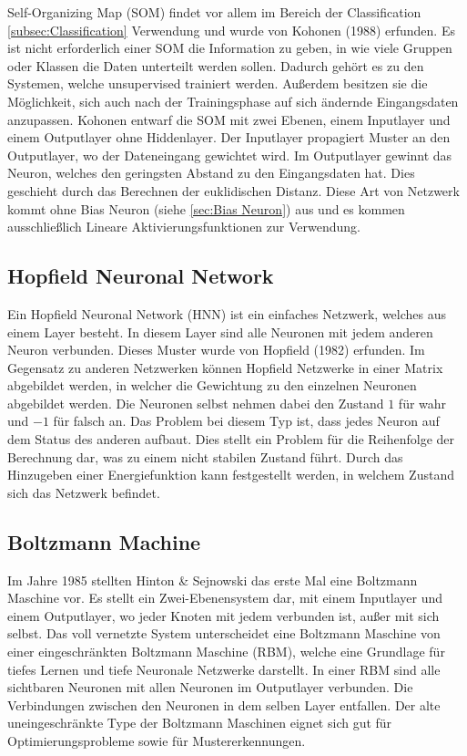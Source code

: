 Self-Organizing Map (SOM) findet vor allem im Bereich der Classification \ref{subsec:Classification} Verwendung und wurde von Kohonen (1988) erfunden. 
Es ist nicht erforderlich einer SOM die Information zu geben, in wie viele Gruppen oder Klassen die Daten unterteilt werden sollen. 
Dadurch gehört es zu den Systemen, welche unsupervised trainiert werden. 
Außerdem besitzen sie die Möglichkeit, sich auch nach der Trainingsphase auf sich ändernde Eingangsdaten anzupassen. 
Kohonen entwarf die SOM mit zwei Ebenen, einem Inputlayer und einem Outputlayer ohne Hiddenlayer. 
Der Inputlayer propagiert Muster an den Outputlayer, wo der Dateneingang gewichtet wird. 
Im Outputlayer gewinnt das Neuron, welches den geringsten Abstand zu den Eingangsdaten hat.
Dies geschieht durch das Berechnen der euklidischen Distanz. 
Diese Art von Netzwerk kommt ohne Bias Neuron (siehe \ref{sec:Bias Neuron}) aus und es kommen ausschließlich Lineare Aktivierungsfunktionen zur Verwendung.


\subsection{Hopfield Neuronal Network}

Ein Hopfield Neuronal Network (HNN) \cite{demuth2014neural} ist ein einfaches Netzwerk, welches aus einem Layer besteht. 
In diesem Layer sind alle Neuronen mit jedem anderen Neuron verbunden. 
Dieses Muster wurde von Hopfield (1982) erfunden. 
Im Gegensatz zu anderen Netzwerken können Hopfield Netzwerke in einer Matrix abgebildet werden, in welcher die Gewichtung zu den einzelnen Neuronen abgebildet werden. 
Die Neuronen selbst nehmen dabei den Zustand $1$ für wahr und $-1$ für falsch an.
Das Problem bei diesem Typ ist, dass jedes Neuron auf dem Status des anderen aufbaut.
Dies stellt ein Problem für die Reihenfolge der Berechnung dar, was zu einem nicht stabilen Zustand führt.
Durch das Hinzugeben einer Energiefunktion kann festgestellt werden, in welchem Zustand sich das Netzwerk befindet.

\subsection{Boltzmann Machine}

Im Jahre 1985 stellten Hinton \& Sejnowski \cite{Hinton:Boltzman:2007} das erste Mal eine Boltzmann Maschine vor.
Es stellt ein Zwei-Ebenensystem dar, mit einem Inputlayer und einem Outputlayer, wo jeder Knoten mit jedem verbunden ist, außer mit sich selbst.
Das voll vernetzte System unterscheidet eine Boltzmann Maschine von einer eingeschränkten Boltzmann Maschine (RBM), welche eine Grundlage für tiefes Lernen und tiefe Neuronale Netzwerke darstellt.
In einer RBM sind alle sichtbaren Neuronen mit allen Neuronen im Outputlayer verbunden. 
Die Verbindungen zwischen den Neuronen in dem selben Layer entfallen.
Der alte uneingeschränkte Type der Boltzmann Maschinen eignet sich gut für Optimierungsprobleme sowie für Mustererkennungen.

